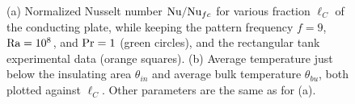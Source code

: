 \begin{figure}
\centering
{}
\caption{%
(a) Normalized Nusselt number
$\text{Nu}/\text{Nu}_{fc}$ for various fraction $\ell_C$ of the conducting plate,
while keeping the pattern frequency $f=9$, $\text{Ra}=10^8$, and $\text{Pr}=1$ (green circles),
and the rectangular tank experimental data \citep{Wang2017} (orange squares).
(b) Average temperature just below the insulating area $\theta_{in}$ and
average bulk temperature $\theta_{bu}$, both plotted against $\ell_C$.
Other parameters are the same as for (a).}
\label{figure9}%
\end{figure}%

